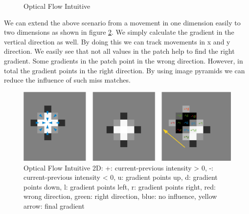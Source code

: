 \documentclass[11pt,a4paper,titlepage,oneside]{report}
\begin{document}
\begin{figure}[H]
	\caption{Optical Flow Intuitive}\label{fig:optical_flow_intuitive}
\end{figure}

We can extend the above scenario from a movement in one dimension easily to two dimensions as shown in figure \ref{fig:optical_flow_2d}. We simply calculate the gradient in the vertical direction as well. By doing this we can track movements in x and y direction. We easily see that not all values in the patch help to find the right gradient. Some gradients in the patch point in the wrong direction. However, in total the gradient points in the right direction. By using image pyramids we can reduce the influence of such miss matches.
\begin{figure}[H]
	\includegraphics[width=1.0\textwidth]{img/optical_flow_2d.png}
	\caption{Optical Flow Intuitive 2D: +: current-previous intensity > 0, -: current-previous intensity < 0, u: gradient points up, d: gradient points down, l: gradient points left, r: gradient points right, red: wrong direction, green: right direction, blue: no influence, yellow arrow: final gradient}\label{fig:optical_flow_2d}
\end{figure}
\end{document}
